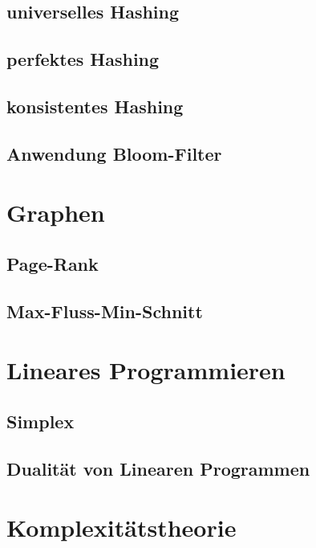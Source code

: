 \subsection{universelles Hashing}
\subsection{perfektes Hashing}
\subsection{konsistentes Hashing}
\subsection{Anwendung Bloom-Filter}


\section{Graphen}

\subsection{Page-Rank}
\subsection{Max-Fluss-Min-Schnitt}


\section{Lineares Programmieren}

\subsection{Simplex}
\subsection{Dualität von Linearen Programmen}

\section{Komplexitätstheorie}
